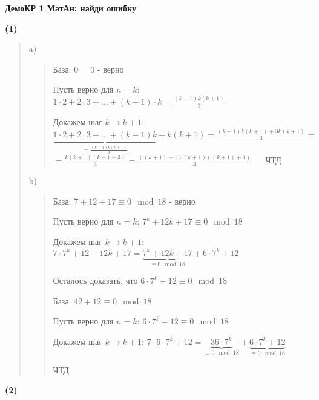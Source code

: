 \documentclass{article}
\begin{document}
\setlength{\parindent}{0pt}
\begin{Large}
    \textsf{\textbf{ДемоКР 1 МатАн: найди ошибку}}
    
\end{Large}
\vspace{1cm}

\textbf{\textsf{(1)}}
\begin{quote}
    a) 
    \begin{quote}
        
    База: 0 = 0  - верно
    
    Пусть верно для $n = k$: $1 \cdot 2 + 2 \cdot 3 + ... + (k - 1) \cdot k = \frac{(k - 1)k(k + 1)}{3}$
    
    Докажем шаг $k \rightarrow k + 1$: $\underbrace{1 \cdot 2 + 2 \cdot 3 + ... + (k - 1)k}_{= \frac{(k - 1)k(k + 1)}{3}} + k(k + 1) = \frac{(k - 1)k(k + 1) + 3k(k + 1)}{3} = $
    $= \frac{k(k + 1)(k - 1 + 3)}{3} =  \frac{((k + 1) - 1)(k + 1)((k + 1) + 1)}{3}$ $\quad$ ЧТД
    \end{quote}

    b) 
    \begin{quote}
    
        База: $7 + 12 + 17 \equiv 0 \mod 18$ - верно
        
        Пусть верно для $n = k$: $7^k + 12k + 17 \equiv 0 \mod 18$
        
        Докажем шаг $k \rightarrow k + 1$: $7 \cdot 7^k + 12 + 12k + 17 = \underbrace{7^k + 12k + 17}_{\equiv 0 \mod 18} + 6 \cdot 7^k + 12$

        Осталось доказать, что $6 \cdot 7^k + 12 \equiv 0 \mod 18$
        
        База: $42 + 12 \equiv 0 \mod 18$

        Пусть верно для $n = k$: $6 \cdot 7^k + 12 \equiv 0 \mod 18$

        Докажем шаг $k \rightarrow k + 1$: $7 \cdot 6 \cdot 7^k + 12 = \underbrace{36 \cdot 7^k}_{\equiv 0 \mod 18} + \underbrace{6 \cdot 7^k + 12}_{\equiv 0 \mod 18}$

        ЧТД
    \end{quote}
    
    
    \end{quote} 

    
\textbf{\textsf{(2)}}
\end{document}
